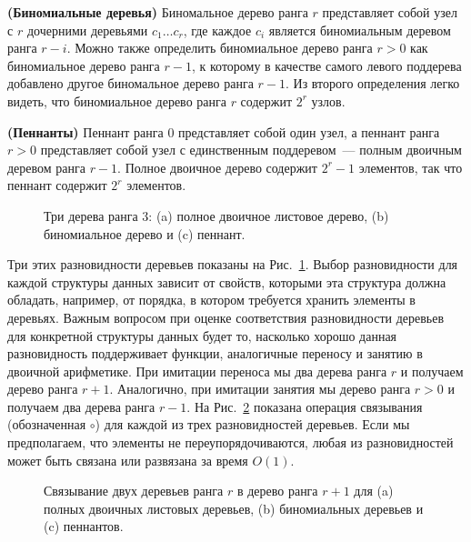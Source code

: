 \begin{definition}
  \textbf{(Биномиальные деревья)} Биномальное дерево ранга $r$
  представляет собой узел с $r$ дочерними деревьями $c_1 \ldots c_r$,
  где каждое $c_i$ является биномиальным деревом ранга $r -
  i$. Можно также определить биномиальное дерево ранга $r > 0$ как
  биномиальное дерево ранга $r - 1$, к которому в качестве самого
  левого поддерева добавлено другое биномальное дерево ранга $r -
  1$. Из второго определения легко видеть, что биномиальное дерево
  ранга $r$ содержит $2^r$ узлов.
\end{definition}

\begin{definition}
  \textbf{(Пеннанты)} Пеннант ранга 0 представляет собой один узел, а
  пеннант ранга $r > 0$ представляет собой узел с единственным
  поддеревом~--- полным двоичным деревом ранга $r - 1$. Полное
  двоичное дерево содержит $2^r - 1$ элементов, так что пеннант
  содержит $2^r$ элементов.
\end{definition}

\begin{figure}
  \centering
  
  \caption{Три дерева ранга 3: (a) полное двоичное листовое дерево, (b) биномиальное дерево и (c) пеннант.}
  \label{fig:9.2}
\end{figure}

Три этих разновидности деревьев показаны на
Рис.~\ref{fig:9.2}. Выбор разновидности для каждой структуры данных
зависит от свойств, которыми эта структура должна обладать, например,
от порядка, в котором требуется хранить элементы в деревьях. Важным
вопросом при оценке соответствия разновидности деревьев для конкретной
структуры данных будет то, насколько хорошо данная разновидность
поддерживает функции, аналогичные переносу и занятию в двоичной
арифметике. При имитации переноса мы  два дерева
ранга $r$ и получаем дерево ранга $r+1$. Аналогично, при имитации
занятия мы  дерево ранга $r > 0$ и получаем
два дерева ранга $r-1$. На Рис.~\ref{fig:9.3} показана операция
связывания (обозначенная $\circ$) %
для каждой из трех разновидностей деревьев. Если мы предполагаем, что
элементы не переупорядочиваются, любая из разновидностей может быть
связана или развязана за время $O(1)$.

\begin{figure}
  \centering
  
  \caption{Связывание двух деревьев ранга $r$ в дерево ранга $r+1$ для (a) полных двоичных листовых деревьев, (b) биномиальных деревьев и (c) пеннантов.}
  \label{fig:9.3}
\end{figure}


